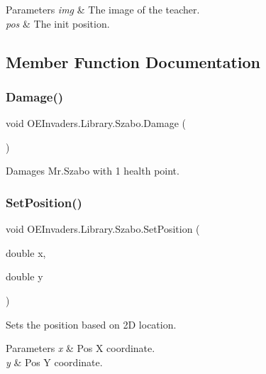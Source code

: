 \begin{DoxyParams}{Parameters}
{\em img} & The image of the teacher.\\
\hline
{\em pos} & The init position.\\
\hline
\end{DoxyParams}


\subsection{Member Function Documentation}
\mbox{\label{class_o_e_invaders_1_1_library_1_1_szabo_a7040cd46c3f1254f6f568c627be72803}} 
\subsubsection{\texorpdfstring{Damage()}{Damage()}}
{\footnotesize\ttfamily void O\+E\+Invaders.\+Library.\+Szabo.\+Damage (\begin{DoxyParamCaption}{ }\end{DoxyParamCaption})}



Damages Mr.\+Szabo with 1 health point. 

\mbox{\label{class_o_e_invaders_1_1_library_1_1_szabo_ac6ad2984cd7d74f7da5e2963f5e69a8f}} 
\subsubsection{\texorpdfstring{SetPosition()}{SetPosition()}}
{\footnotesize\ttfamily void O\+E\+Invaders.\+Library.\+Szabo.\+Set\+Position (\begin{DoxyParamCaption}\item[{double}]{x,  }\item[{double}]{y }\end{DoxyParamCaption})}



Sets the position based on 2D location. 


\begin{DoxyParams}{Parameters}
{\em x} & Pos X coordinate.\\
\hline
{\em y} & Pos Y coordinate.\\
\hline
\end{DoxyParams}


